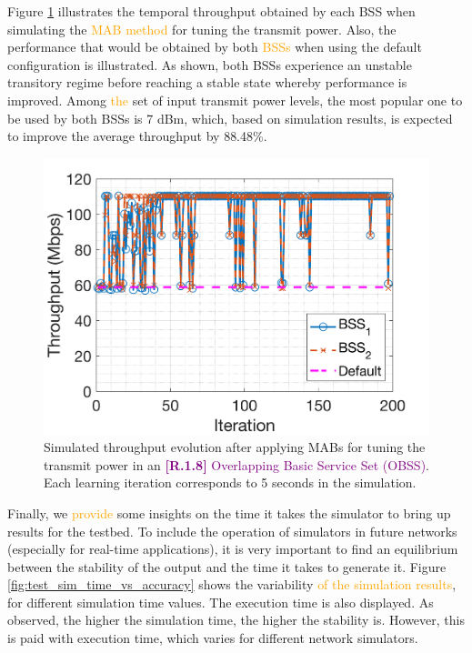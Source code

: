 \documentclass[journal]{IEEEtran}
\begin{document}
	Figure \ref{fig:results_komondor} illustrates the temporal throughput obtained by each BSS when simulating the \textcolor{orange}{MAB method} for tuning the transmit power. Also, the performance that would be obtained by both \textcolor{orange}{BSSs} when using the default configuration is illustrated. As shown, both BSSs experience an unstable transitory regime before reaching a stable state whereby performance is improved. Among \textcolor{orange}{the} set of input transmit power levels, the most popular one to be used by both BSSs is 7 dBm, which, based on simulation results, is expected to improve the average throughput by 88.48\%.
	
	\begin{figure}[ht!]
	\centering
	\includegraphics[width=0.8\columnwidth]{throughput_evolution_komondor.png}
	\caption{Simulated throughput evolution after applying MABs for tuning the transmit power in an \textcolor{purple}{\textbf{[R.1.8]} Overlapping Basic Service Set (OBSS)}. Each learning iteration corresponds to 5 seconds in the simulation.}
	\label{fig:results_komondor}
	\end{figure}
	
	Finally, we \textcolor{orange}{provide} some insights on the time it takes the simulator to bring up results for the testbed. To include the operation of simulators in future networks (especially for real-time applications), it is very important to find an equilibrium between the stability of the output and the time it takes to generate it. Figure \ref{fig:test_sim_time_vs_accuracy} shows the variability \textcolor{orange}{of the simulation results}, for different simulation time values. The execution time is also displayed. As observed, the higher the simulation time, the higher the stability is. However, this is paid with execution time, which varies for different network simulators.
	
\end{document}

